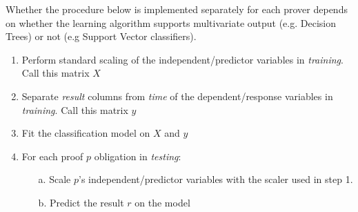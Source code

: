 \documentclass[]{article}
\begin{document}
Whether the procedure below is implemented separately for each prover depends on whether the learning algorithm supports multivariate output (e.g. Decision Trees) or not (e.g Support Vector classifiers). 

\begin{enumerate}
\item{Perform standard scaling of the independent/predictor variables in \emph{training}. Call this matrix $X$}
\item{Separate \textit{result} columns from \textit{time} of the dependent/response variables in \textit{training}. Call this matrix $y$}
\item{Fit the classification model on $X$ and $y$}
\item{For each proof $p$ obligation in \textit{testing}:}
\begin{itemize}
	\item[a.] Scale $p$'s independent/predictor variables with the scaler used in step 1.
	\item[b.] Predict the result $r$ on the model
\end{itemize}
\end{enumerate}
  
\end{document}
